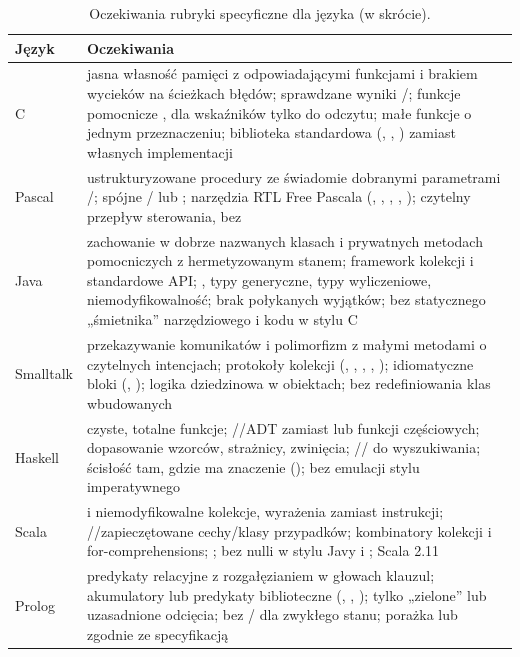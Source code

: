 \begin{table}[htbp]
  \centering
  \caption{Oczekiwania rubryki specyficzne dla języka (w skrócie).}
  \label{tab:rubric-langs}
  \small
  \begin{tabularx}{\textwidth}{@{}lY@{}}
    \toprule
    Język & Oczekiwania \\
    \midrule
    C         & jasna własność pamięci z odpowiadającymi funkcjami  i brakiem wycieków na ścieżkach błędów; sprawdzane wyniki /; funkcje pomocnicze ,  dla wskaźników tylko do odczytu; małe funkcje o jednym przeznaczeniu; biblioteka standardowa (, , ) zamiast własnych implementacji \\
    Pascal    & ustrukturyzowane procedury ze świadomie dobranymi parametrami /; spójne / lub ; narzędzia RTL Free Pascala (, , , , ); czytelny przepływ sterowania, bez  \\
    Java      & zachowanie w dobrze nazwanych klasach i prywatnych metodach pomocniczych z hermetyzowanym stanem; framework kolekcji i standardowe API; , typy generyczne, typy wyliczeniowe, niemodyfikowalność; brak połykanych wyjątków; bez statycznego „śmietnika” narzędziowego i kodu w stylu C \\
    Smalltalk & przekazywanie komunikatów i polimorfizm z małymi metodami o czytelnych intencjach; protokoły kolekcji (, , , , ); idiomatyczne bloki (, ); logika dziedzinowa w obiektach; bez redefiniowania klas wbudowanych \\
    Haskell   & czyste, totalne funkcje; //ADT zamiast  lub funkcji częściowych; dopasowanie wzorców, strażnicy, zwinięcia; // do wyszukiwania; ścisłość tam, gdzie ma znaczenie (); bez emulacji stylu imperatywnego \\
    Scala     &  i niemodyfikowalne kolekcje, wyrażenia zamiast instrukcji; //zapieczętowane cechy/klasy przypadków; kombinatory kolekcji i for-comprehensions; ; bez nulli w stylu Javy i ; Scala 2.11 \\
    Prolog    & predykaty relacyjne z rozgałęzianiem w głowach klauzul; akumulatory lub predykaty biblioteczne (, , ); tylko „zielone” lub uzasadnione odcięcia; bez / dla zwykłego stanu; porażka lub  zgodnie ze specyfikacją \\
    \bottomrule
  \end{tabularx}
\end{table}

